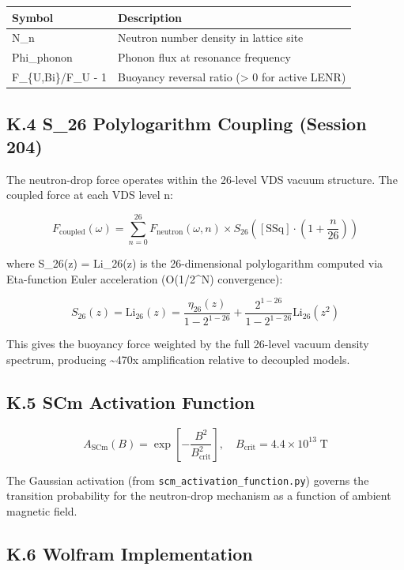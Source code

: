 \documentclass[11pt]{article}
\begin{document}
\begin{center}
\begin{longtable}{ll}
\toprule
Symbol & Description \tabularnewline
\midrule
\endhead
N\_n & Neutron number density in lattice site \tabularnewline
Phi\_phonon & Phonon flux at resonance frequency \tabularnewline
F\_\{U,Bi\}/F\_U - 1 & Buoyancy reversal ratio (> 0 for active LENR) \tabularnewline
\bottomrule
\end{longtable}
\end{center}

\subsection*{K.4 S\_26 Polylogarithm Coupling (Session 204)}

The neutron-drop force operates within the 26-level VDS vacuum structure. The coupled force at each VDS level n:

$$F_{\mathrm{coupled}}(\omega) = \sum_{n=0}^{26} F_{\mathrm{neutron}}(\omega, n) \times S_{26}\!\left([\text{SSq}] \cdot \left(1 + \frac{n}{26}\right)\right)$$

where S\_26(z) = Li\_26(z) is the 26-dimensional polylogarithm computed via Eta-function Euler acceleration (O(1/2\textasciicircum{}N) convergence):

$$S_{26}(z) = \text{Li}_{26}(z) = \frac{\eta_{26}(z)}{1 - 2^{1-26}} + \frac{2^{1-26}}{1 - 2^{1-26}} \text{Li}_{26}(z^2)$$

This gives the buoyancy force weighted by the full 26-level vacuum density spectrum, producing \textasciitilde{}470x amplification relative to decoupled models.

\subsection*{K.5 SCm Activation Function}

$$A_{\mathrm{SCm}}(B) = \exp\!\left[-\frac{B^2}{B_{\mathrm{crit}}^2}\right], \quad B_{\mathrm{crit}} = 4.4 \times 10^{13} \;\text{T}$$

The Gaussian activation (from \verb|scm_activation_function.py|) governs the transition probability for the neutron-drop mechanism as a function of ambient magnetic field.

\subsection*{K.6 Wolfram Implementation}
\end{document}
